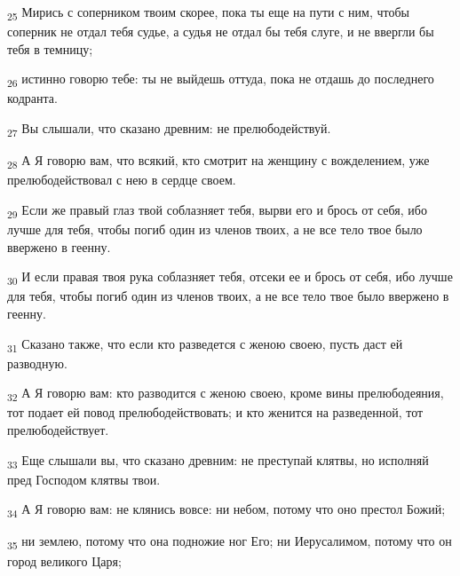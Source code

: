 \begin{tcolorbox}
\textsubscript{25} Мирись с соперником твоим скорее, пока ты еще на пути с ним, чтобы соперник не отдал тебя судье, а судья не отдал бы тебя слуге, и не ввергли бы тебя в темницу;
\end{tcolorbox}
\begin{tcolorbox}
\textsubscript{26} истинно говорю тебе: ты не выйдешь оттуда, пока не отдашь до последнего кодранта.
\end{tcolorbox}
\begin{tcolorbox}
\textsubscript{27} Вы слышали, что сказано древним: не прелюбодействуй.
\end{tcolorbox}
\begin{tcolorbox}
\textsubscript{28} А Я говорю вам, что всякий, кто смотрит на женщину с вожделением, уже прелюбодействовал с нею в сердце своем.
\end{tcolorbox}
\begin{tcolorbox}
\textsubscript{29} Если же правый глаз твой соблазняет тебя, вырви его и брось от себя, ибо лучше для тебя, чтобы погиб один из членов твоих, а не все тело твое было ввержено в геенну.
\end{tcolorbox}
\begin{tcolorbox}
\textsubscript{30} И если правая твоя рука соблазняет тебя, отсеки ее и брось от себя, ибо лучше для тебя, чтобы погиб один из членов твоих, а не все тело твое было ввержено в геенну.
\end{tcolorbox}
\begin{tcolorbox}
\textsubscript{31} Сказано также, что если кто разведется с женою своею, пусть даст ей разводную.
\end{tcolorbox}
\begin{tcolorbox}
\textsubscript{32} А Я говорю вам: кто разводится с женою своею, кроме вины прелюбодеяния, тот подает ей повод прелюбодействовать; и кто женится на разведенной, тот прелюбодействует.
\end{tcolorbox}
\begin{tcolorbox}
\textsubscript{33} Еще слышали вы, что сказано древним: не преступай клятвы, но исполняй пред Господом клятвы твои.
\end{tcolorbox}
\begin{tcolorbox}
\textsubscript{34} А Я говорю вам: не клянись вовсе: ни небом, потому что оно престол Божий;
\end{tcolorbox}
\begin{tcolorbox}
\textsubscript{35} ни землею, потому что она подножие ног Его; ни Иерусалимом, потому что он город великого Царя;
\end{tcolorbox}
